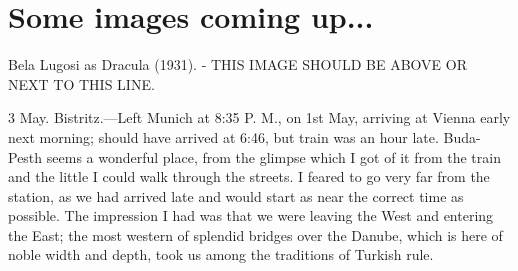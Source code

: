 \section{Some images coming up...}

\renewcommand{\varCaption}{Bela Lugosi as Dracula (1931).}
\renewcommand{\varImgPath}{_content/Dracula_Bela_Lugosi-295x384.jpg}


Bela Lugosi as Dracula (1931). - THIS IMAGE SHOULD BE ABOVE OR NEXT TO THIS LINE.





 3 May. Bistritz.---Left Munich at 8:35 P. M., on 1st May, arriving at Vienna early next morning; should have arrived at 6:46, but train was an hour late. Buda-Pesth seems a wonderful place, from the glimpse which I got of it from the train and the little I could walk through the streets. I feared to go very far from the station, as we had arrived late and would start as near the correct time as possible. The impression I had was that we were leaving the West and entering the East; the most western of splendid bridges over the Danube, which is here of noble width and depth, took us among the traditions of Turkish rule.


